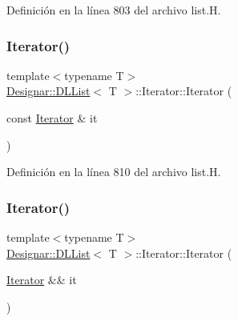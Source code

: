 Definición en la línea 803 del archivo list.\+H.

\mbox{\label{class_designar_1_1_d_l_list_1_1_iterator_a824a391fc47274867bffac143a3d740b}} 
\subsubsection{\texorpdfstring{Iterator()}{Iterator()}\hspace{0.1cm}{\footnotesize\ttfamily [4/5]}}
{\footnotesize\ttfamily template$<$typename T$>$ \\
\hyperlink{class_designar_1_1_d_l_list}{Designar\+::\+D\+L\+List}$<$ T $>$\+::Iterator\+::\+Iterator (\begin{DoxyParamCaption}\item[{const \hyperlink{class_designar_1_1_d_l_list_1_1_iterator}{Iterator} \&}]{it }\end{DoxyParamCaption})\hspace{0.3cm}{\ttfamily [inline]}}



Definición en la línea 810 del archivo list.\+H.

\mbox{\label{class_designar_1_1_d_l_list_1_1_iterator_ad6d70cfea31c61502831f20b87d4f56f}} 
\subsubsection{\texorpdfstring{Iterator()}{Iterator()}\hspace{0.1cm}{\footnotesize\ttfamily [5/5]}}
{\footnotesize\ttfamily template$<$typename T$>$ \\
\hyperlink{class_designar_1_1_d_l_list}{Designar\+::\+D\+L\+List}$<$ T $>$\+::Iterator\+::\+Iterator (\begin{DoxyParamCaption}\item[{\hyperlink{class_designar_1_1_d_l_list_1_1_iterator}{Iterator} \&\&}]{it }\end{DoxyParamCaption})\hspace{0.3cm}{\ttfamily [inline]}}



